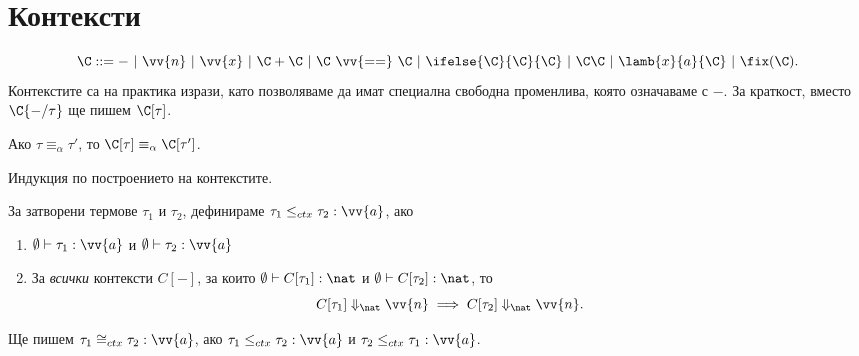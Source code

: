 \section{Контексти}\label{pcf:sect:context}

\[\C ::= -\ |\ \vv{n}\ |\ \vv{x}\ |\ \C + \C\ |\ \C\ \vv{==}\ \C\ |\ \ifelse{\C}{\C}{\C}\ |\ \C\C\ |\ \lamb{x}{a}{\C}\ |\ \fix(\C).\]
Контекстите са на практика изрази, като позволяваме да имат специална свободна променлива, която означаваме с $-$.
За краткост, вместо $\C\{-/\tau\}$ ще пишем $\C[\tau]$.

\begin{proposition}
  Ако $\tau \equiv_\alpha \tau'$, то $\C[\tau] \equiv_\alpha \C[\tau']$.
\end{proposition}
\begin{hint}
  Индукция по построението на контекстите.
\end{hint}

\begin{definition}\label{df:context:equivalence}
  За затворени термове $\tau_1$ и $\tau_2$, дефинираме
  $\tau_1 \leq_{ctx} \tau_2 : \vv{a}$, ако
  \begin{enumerate}[1)]
  \item
    $\emptyset \vdash \tau_1 : \vv{a}$ и $\emptyset \vdash \tau_2 : \vv{a}$
  \item
    За \emph{всички} контексти $C[-]$, за които $\emptyset \vdash C[\tau_1] : \nat$ и $\emptyset \vdash C[\tau_2] : \nat$, то
    \[C[\tau_1] \Downarrow_{\nat} \vv{n} \implies C[\tau_2] \Downarrow_{\nat} \vv{n}.\]
  \end{enumerate}
  Ще пишем $\tau_1 \cong_{ctx} \tau_2 : \vv{a}$, ако
  $\tau_1 \leq_{ctx} \tau_2 : \vv{a}$ и $\tau_2 \leq_{ctx} \tau_1 : \vv{a}$.
\end{definition}


